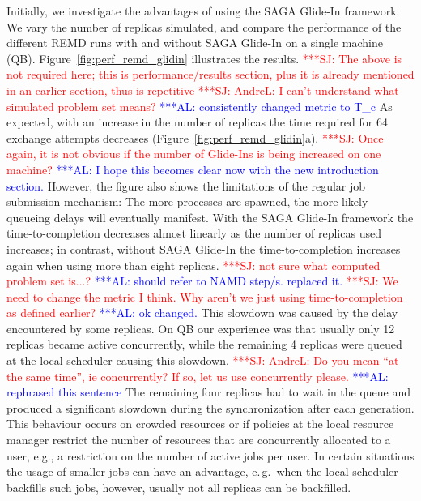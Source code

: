 \documentclass{rspublic}
\newcommand{\alnote}[1]{ {\textcolor{blue} { ***AL: #1 }}}
\newcommand{\jhanote}[1]{ {\textcolor{red} { ***SJ: #1 }}}
\newcommand{\alnote}[1]{}
\newcommand{\jhanote}[1]{}
\begin{document}
Initially, we investigate the advantages of using the SAGA 
Glide-In framework. We vary the number of replicas simulated, and
compare the performance of the different REMD runs with and without
SAGA Glide-In on a single machine (QB).
Figure~\ref{fig:perf_remd_glidin} illustrates the results.
\jhanote{The above is not required here; this is performance/results
  section, plus it is already mentioned in an earlier section, thus is
  repetitive}
\jhanote{AndreL: I can't understand what simulated problem set means?}
\alnote{consistently changed metric to T\_c}
As expected, with an increase in the number of replicas the time
required for 64 exchange attempts decreases
(Figure~\ref{fig:perf_remd_glidin}a).
\jhanote{Once again, it is not obvious if the number of Glide-Ins is
  being increased on one machine?}  \alnote{I hope this becomes clear
  now with the new introduction section.}  However, the figure also
shows the limitations of the regular job submission mechanism: The
more processes are spawned, the more likely queueing delays will
eventually manifest.  With the SAGA Glide-In framework the
time-to-completion decreases almost linearly as the number of replicas
used increases; in contrast, without SAGA Glide-In the
time-to-completion increases again when using more than eight
replicas.  \jhanote{not sure what computed problem set is...?}
\alnote{should refer to NAMD step/s. replaced it.}  \jhanote{We need
  to change the metric I think. Why aren't we just using
  time-to-completion as defined earlier?}\alnote{ok changed.}  This
slowdown was caused by the delay encountered by some replicas.  On QB
our experience was that usually only 12 replicas became active
concurrently, while the remaining 4 replicas were queued at the local
scheduler causing this slowdown.  \jhanote{AndreL: Do you mean ``at
  the same time'', ie concurrently? If so, let us use concurrently
  please.}\alnote{rephrased this sentence} The remaining four replicas
had to wait in the queue and produced a significant slowdown during
the synchronization after each generation.  This behaviour occurs on
crowded resources or if policies at the local resource manager
restrict the number of resources that are concurrently allocated to a
user, e.g., a restriction on the number of active jobs per user.  In
certain situations the usage of smaller jobs can have an advantage,
e.\,g.\ when the local scheduler backfills such jobs, however, usually
not all replicas can be backfilled.
\end{document}
